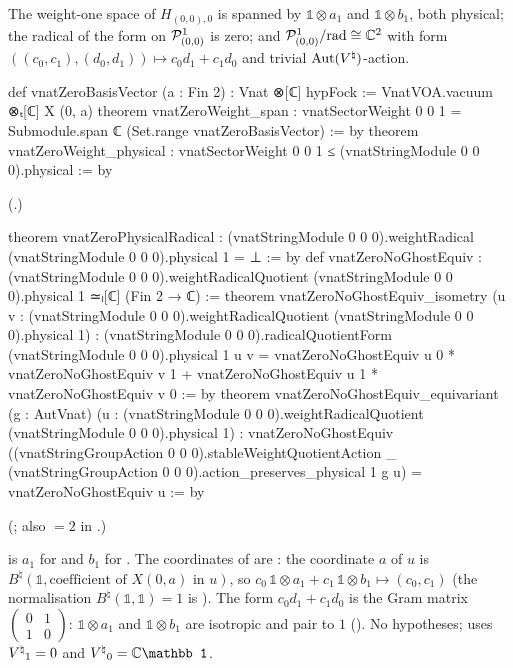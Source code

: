 \begin{theorem}\label{ch18:thm:zeromomentum}
The weight-one space of $H_{(0,0),0}$ is spanned by $\mathbb 1\otimes a_1$ and $\mathbb 1\otimes b_1$, both physical; the radical of
the form on $\mathcal{P}^1_{(0,0)}$ is zero; and $\mathcal{P}^1_{(0,0)}/\mathrm{rad}\cong\mathbb C^2$ with form
$((c_0,c_1),(d_0,d_1))\mapsto c_0d_1+c_1d_0$ and trivial $\operatorname{Aut}({V^{\natural}})$-action.
\end{theorem}
\begin{leancode}
def vnatZeroBasisVector (a : Fin 2) : Vnat ⊗[ℂ] hypFock :=
  VnatVOA.vacuum ⊗ₜ[ℂ] X (0, a)
theorem vnatZeroWeight_span :
    vnatSectorWeight 0 0 1 = Submodule.span ℂ (Set.range vnatZeroBasisVector) := by
theorem vnatZeroWeight_physical :
    vnatSectorWeight 0 0 1 ≤ (vnatStringModule 0 0 0).physical := by
\end{leancode}
(.)
\begin{leancode}
theorem vnatZeroPhysicalRadical :
    (vnatStringModule 0 0 0).weightRadical (vnatStringModule 0 0 0).physical 1 = ⊥ := by
def vnatZeroNoGhostEquiv :
    (vnatStringModule 0 0 0).weightRadicalQuotient (vnatStringModule 0 0 0).physical 1 ≃ₗ[ℂ]
      (Fin 2 → ℂ) :=
theorem vnatZeroNoGhostEquiv_isometry
    (u v : (vnatStringModule 0 0 0).weightRadicalQuotient (vnatStringModule 0 0 0).physical 1) :
    (vnatStringModule 0 0 0).radicalQuotientForm (vnatStringModule 0 0 0).physical 1 u v =
      vnatZeroNoGhostEquiv u 0 * vnatZeroNoGhostEquiv v 1 +
        vnatZeroNoGhostEquiv u 1 * vnatZeroNoGhostEquiv v 0 := by
theorem vnatZeroNoGhostEquiv_equivariant (g : AutVnat)
    (u : (vnatStringModule 0 0 0).weightRadicalQuotient (vnatStringModule 0 0 0).physical 1) :
    vnatZeroNoGhostEquiv
      ((vnatStringGroupAction 0 0 0).stableWeightQuotientAction _
        (vnatStringGroupAction 0 0 0).action_preserves_physical 1 g u) =
      vnatZeroNoGhostEquiv u := by
\end{leancode}
(; also  $=2$ in
.)
\begin{dictionary}
 is $a_1$ for  and $b_1$ for .  The coordinates of
 are : the coordinate $a$ of $u$ is
$B^\natural(\mathbb 1,\text{coefficient of }X(0,a)\text{ in }u)$, so $c_0\,\mathbb 1\otimes a_1+c_1\,\mathbb 1\otimes b_1\mapsto(c_0,c_1)$ (the
normalisation $B^\natural(\mathbb 1,\mathbb 1)=1$ is ).  The form $c_0d_1+c_1d_0$ is the Gram
matrix $\left(\begin{smallmatrix}0&1\\1&0\end{smallmatrix}\right)$: $\mathbb 1\otimes a_1$ and $\mathbb 1\otimes b_1$ are isotropic and pair to
$1$ ().  No hypotheses; uses ${V^{\natural}}_1=0$ and $\Vnat_0=\mathbb C\mathbb 1$.
\end{dictionary}
